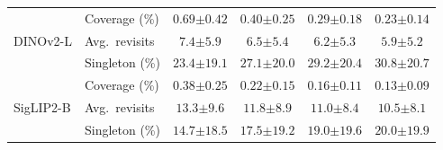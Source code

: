 \begin{table}[t]
\begin{tabular}{llcccc}
\hline
\multirow{3}{*}{DINOv2-L} & Coverage (\%) & $0.69{\scriptstyle\pm0.42}$ & $0.40{\scriptstyle\pm0.25}$ & $0.29{\scriptstyle\pm0.18}$ & $0.23{\scriptstyle\pm0.14}$ \\
    & Avg.\ revisits & $7.4{\scriptstyle\pm5.9}$ & $6.5{\scriptstyle\pm5.4}$ & $6.2{\scriptstyle\pm5.3}$ & $5.9{\scriptstyle\pm5.2}$ \\
    & Singleton (\%) & $23.4{\scriptstyle\pm19.1}$ & $27.1{\scriptstyle\pm20.0}$ & $29.2{\scriptstyle\pm20.4}$ & $30.8{\scriptstyle\pm20.7}$ \\
\hline
\multirow{3}{*}{SigLIP2-B} & Coverage (\%) & $0.38{\scriptstyle\pm0.25}$ & $0.22{\scriptstyle\pm0.15}$ & $0.16{\scriptstyle\pm0.11}$ & $0.13{\scriptstyle\pm0.09}$ \\
    & Avg.\ revisits & $13.3{\scriptstyle\pm9.6}$ & $11.8{\scriptstyle\pm8.9}$ & $11.0{\scriptstyle\pm8.4}$ & $10.5{\scriptstyle\pm8.1}$ \\
    & Singleton (\%) & $14.7{\scriptstyle\pm18.5}$ & $17.5{\scriptstyle\pm19.2}$ & $19.0{\scriptstyle\pm19.6}$ & $20.0{\scriptstyle\pm19.9}$ \\
\hline
\end{tabular}
\end{table}
